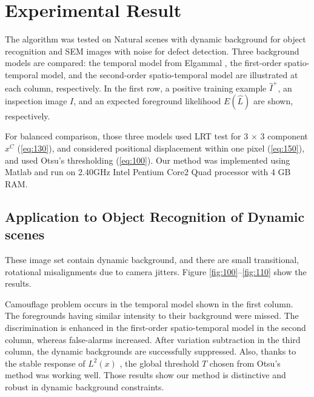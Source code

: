 \documentclass[conference]{IEEEtran}
\begin{document}
\section{Experimental Result}
The algorithm was tested on Natural scenes with dynamic background for object recognition and SEM images with noise for defect detection. Three background models are compared: the temporal model from Elgammal \cite{Elgammal}, the first-order spatio-temporal model, and the second-order spatio-temporal model are illustrated at each column, respectively. In the first row, a positive training example \begin{math} \hat{I}^+ \end{math}, an inspection image \begin{math} I \end{math}, and an expected foreground likelihood \begin{math} E(\hat{L}) \end{math} are shown, respectively.

For balanced comparison, those three models used LRT test for 3 \begin{math} \times \end{math} 3 component  \begin{math} x^C \end{math} (\ref{eq:130}), and considered positional displacement within one pixel (\ref{eq:150}), and used Otsu's thresholding (\ref{eq:100}). Our method was implemented using Matlab and run on 2.40GHz Intel Pentium Core2 Quad processor with 4 GB RAM.

\subsection{Application to Object Recognition of Dynamic scenes}
These image set contain dynamic background, and there are small transitional, rotational misalignments due to camera jitters. Figure \ref{fig:100}–\ref{fig:110} show the results. 

Camouflage problem occurs in the temporal model shown in the first column. The foregrounds having similar intensity to their background were missed. The discrimination is enhanced in the first-order spatio-temporal model in the second column, whereas false-alarms increased. After variation subtraction in the third column, the dynamic backgrounds are successfully suppressed. Also, thanks to the stable response of \begin{math} L^2(x) \end{math} , the global threshold \begin{math} T \end{math} chosen from Otsu's method was working well. Those results show our method is distinctive and robust in dynamic background constraints.
\end{document}
